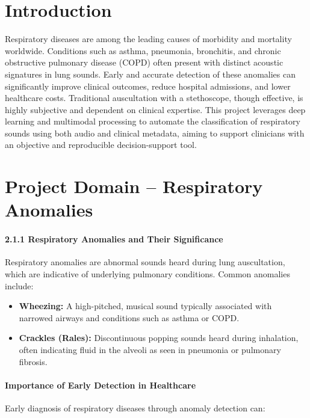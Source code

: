 
\section*{Introduction}
Respiratory diseases are among the leading causes of morbidity and mortality worldwide. Conditions such as asthma, pneumonia, bronchitis, and chronic obstructive pulmonary disease (COPD) often present with distinct acoustic signatures in lung sounds. Early and accurate detection of these anomalies can significantly improve clinical outcomes, reduce hospital admissions, and lower healthcare costs. Traditional auscultation with a stethoscope, though effective, is highly subjective and dependent on clinical expertise. This project leverages deep learning and multimodal processing to automate the classification of respiratory sounds using both audio and clinical metadata, aiming to support clinicians with an objective and reproducible decision-support tool.
\newpage

\section{Project Domain – Respiratory Anomalies}

\paragraph{2.1.1 Respiratory Anomalies and Their Significance\\}
Respiratory anomalies are abnormal sounds heard during lung auscultation, which are indicative of underlying pulmonary conditions. Common anomalies include:

\begin{itemize}
    \item \textbf{Wheezing:} A high-pitched, musical sound typically associated with narrowed airways and conditions such as asthma or COPD.
    \item \textbf{Crackles (Rales):} Discontinuous popping sounds heard during inhalation, often indicating fluid in the alveoli as seen in pneumonia or pulmonary fibrosis.
\end{itemize}

\paragraph{Importance of Early Detection in Healthcare\\}
Early diagnosis of respiratory diseases through anomaly detection can:

